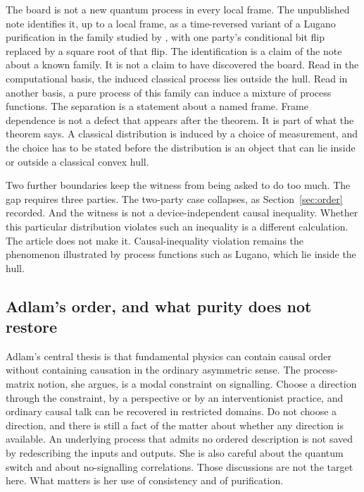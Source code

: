 \documentclass[11pt]{article}
\begin{document}
The board is not a new quantum process in every local frame. The unpublished note identifies it, up to a local frame, as a time-reversed variant of a Lugano purification in the family studied by \citet{guerin2018}, with one party's conditional bit flip replaced by a square root of that flip. The identification is a claim of the note about a known family. It is not a claim to have discovered the board. Read in the computational basis, the induced classical process lies outside the hull. Read in another basis, a pure process of this family can induce a mixture of process functions. The separation is a statement about a named frame. Frame dependence is not a defect that appears after the theorem. It is part of what the theorem says. A classical distribution is induced by a choice of measurement, and the choice has to be stated before the distribution is an object that can lie inside or outside a classical convex hull.

Two further boundaries keep the witness from being asked to do too much. The gap requires three parties. The two-party case collapses, as Section~\ref{sec:order} recorded. And the witness is not a device-independent causal inequality. Whether this particular distribution violates such an inequality is a different calculation. The article does not make it. Causal-inequality violation remains the phenomenon illustrated by process functions such as Lugano, which lie inside the hull.

\subsection{Adlam's order, and what purity does not restore}
\label{sec:adlam}

Adlam's central thesis is that fundamental physics can contain causal order without containing causation in the ordinary asymmetric sense. The process-matrix notion, she argues, is a modal constraint on signalling. Choose a direction through the constraint, by a perspective or by an interventionist practice, and ordinary causal talk can be recovered in restricted domains. Do not choose a direction, and there is still a fact of the matter about whether any direction is available. An underlying process that admits no ordered description is not saved by redescribing the inputs and outputs. She is also careful about the quantum switch and about no-signalling correlations. Those discussions are not the target here. What matters is her use of consistency and of purification.
\end{document}
